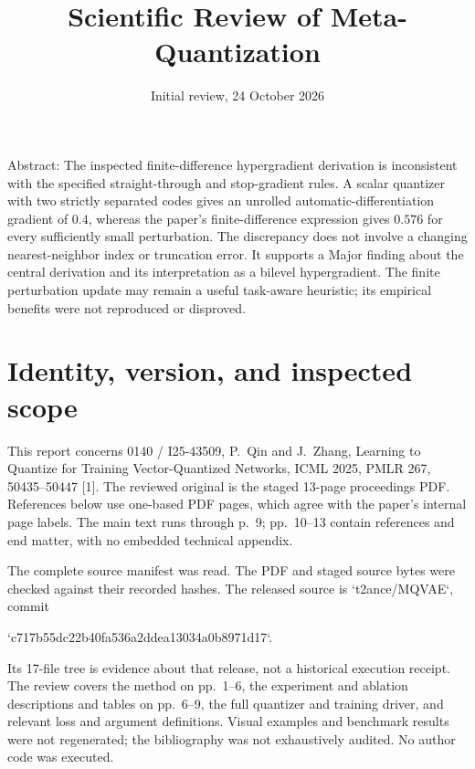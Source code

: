 \documentclass[10pt]{article}
\title{Scientific Review of Meta-Quantization}
\author{}
\date{Initial review, 24 October 2026}
\begin{document}
\maketitle
Abstract: The inspected finite-difference hypergradient derivation is inconsistent with the specified straight-through and stop-gradient rules. A scalar quantizer with two strictly separated codes gives an unrolled automatic-differentiation gradient of \(0.4\), whereas the paper’s finite-difference expression gives \(0.576\) for every sufficiently small perturbation. The discrepancy does not involve a changing nearest-neighbor index or truncation error. It supports a Major finding about the central derivation and its interpretation as a bilevel hypergradient. The finite perturbation update may remain a useful task-aware heuristic; its empirical benefits were not reproduced or disproved.\par
\section*{Identity, version, and inspected scope}
This report concerns 0140 / I25-43509, P. Qin and J. Zhang, Learning to Quantize for Training Vector-Quantized Networks, ICML 2025, PMLR 267, 50435–50447 [1]. The reviewed original is the staged 13-page proceedings PDF. References below use one-based PDF pages, which agree with the paper’s internal page labels. The main text runs through p. 9; pp. 10–13 contain references and end matter, with no embedded technical appendix.\par
The complete source manifest was read. The PDF and staged source bytes were checked against their recorded hashes. The released source is `t2ance/MQVAE`, commit\par
`c717b55dc22b40fa536a2ddea13034a0b8971d17`.\par
Its 17-file tree is evidence about that release, not a historical execution receipt. The review covers the method on pp. 1–6, the experiment and ablation descriptions and tables on pp. 6–9, the full quantizer and training driver, and relevant loss and argument definitions. Visual examples and benchmark results were not regenerated; the bibliography was not exhaustively audited. No author code was executed.\par
\end{document}
